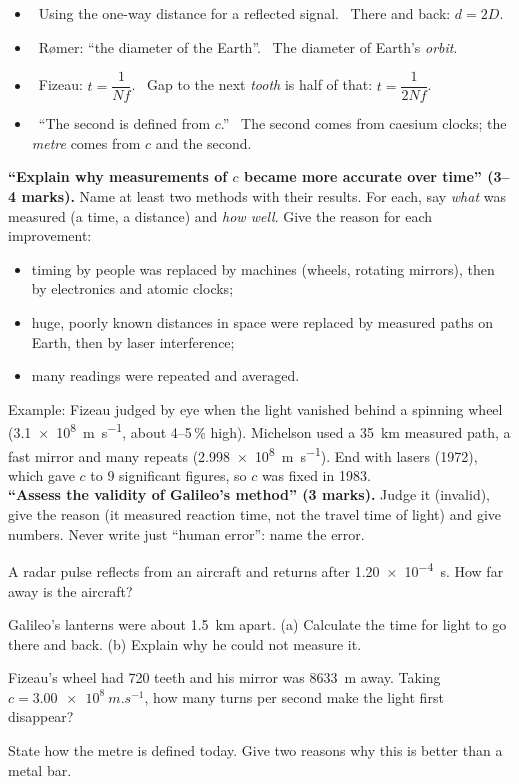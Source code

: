 \begin{mistakes}
\begin{itemize}
  \item \xmark\ Using the one-way distance for a reflected signal. \cmark\ There and back: $d = 2D$.
  \item \xmark\ Rømer: ``the diameter of the Earth''. \cmark\ The diameter of Earth's
        \emph{orbit}.
  \item \xmark\ Fizeau: $t = \dfrac{1}{Nf}$. \cmark\ Gap to the next \emph{tooth} is half of
        that: $t = \dfrac{1}{2Nf}$.
  \item \xmark\ ``The second is defined from $c$.'' \cmark\ The second comes from caesium
        clocks; the \emph{metre} comes from $c$ and the second.
\end{itemize}
\end{mistakes}

\begin{examtip}[breakable]
\textbf{``Explain why measurements of $c$ became more accurate over time'' (3--4 marks).} Name
at least two methods with their results. For each, say \emph{what} was measured (a time, a
distance) and \emph{how well}. Give the reason for each improvement:
\begin{itemize}
  \item timing by people was replaced by machines (wheels, rotating mirrors), then by
        electronics and atomic clocks;
  \item huge, poorly known distances in space were replaced by measured paths on Earth, then by
        laser interference;
  \item many readings were repeated and averaged.
\end{itemize}
Example: Fizeau judged by eye when the light vanished behind a spinning wheel
(\qty{3.1e8}{m.s^{-1}}, about 4--5\,\% high). Michelson used a \qty{35}{km} measured path, a
fast mirror and many repeats (\qty{2.998e8}{m.s^{-1}}). End with lasers (1972), which gave $c$
to 9 significant figures, so $c$ was fixed in 1983.\\[3pt]
\textbf{``Assess the validity of Galileo's method'' (3 marks).} Judge it (invalid), give the
reason (it measured reaction time, not the travel time of light) and give numbers. Never write
just ``human error'': name the error.
\end{examtip}

\begin{quickcheck}
  \item A radar pulse reflects from an aircraft and returns after \qty{1.20e-4}{s}. How far
        away is the aircraft?
  \item Galileo's lanterns were about \qty{1.5}{km} apart. (a) Calculate the time for light to go
        there and back. (b) Explain why he could not measure it.
  \item Fizeau's wheel had 720 teeth and his mirror was \qty{8633}{m} away. Taking
        $c = \qty{3.00e8}{m.s^{-1}}$, how many turns per second make the light first disappear?
  \item State how the metre is defined today. Give two reasons why this is better than a metal
        bar.
\end{quickcheck}

